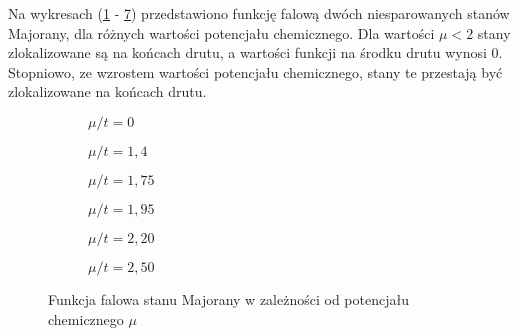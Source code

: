 \documentclass[a4paper, 12pt]{article}
\begin{document}
Na wykresach (\ref{fig:wave_1} - \ref{fig:wave_6}) przedstawiono funkcję falową dwóch niesparowanych stanów Majorany, dla różnych wartości potencjału chemicznego. Dla wartości $\mu < 2$ stany zlokalizowane są na końcach drutu, a wartości funkcji na środku drutu wynosi 0. Stopniowo, ze wzrostem wartości potencjału chemicznego, stany te przestają być zlokalizowane na końcach drutu.



\begin{figure}
\label{fig:kitaev_wave}
        \begin{subfigure}[b]{0.4\textwidth}
	            \fontsize{8}{10}\selectfont %
			    \resizebox{1.0\textwidth}{!}{}
                \caption{$\mu/t = 0$}
                \label{fig:wave_1}
        \end{subfigure}%
        \hspace{\fill}
        \begin{subfigure}[b]{0.4\textwidth}
                    \fontsize{8}{10}\selectfont %
			    \resizebox{1.0\textwidth}{!}{}
                \caption{$\mu/t = 1,4$}
                \label{fig:wave_2}
        \end{subfigure}%
        \hspace{\fill}
        \begin{subfigure}[b]{0.4\textwidth}
                    \fontsize{8}{10}\selectfont %
			    \resizebox{1.0\textwidth}{!}{}
                \caption{$\mu/t = 1,75$}
                \label{fig:wave_3}
        \end{subfigure}%
        \hspace{\fill}
        \begin{subfigure}[b]{0.4\textwidth}
                    \fontsize{8}{10}\selectfont %
			    \resizebox{1.0\textwidth}{!}{}
                \caption{$\mu/t = 1,95$}
                \label{fig:wave_4}
        \end{subfigure}
		\hspace{\fill}
        \begin{subfigure}[b]{0.4\textwidth}
	            \fontsize{8}{10}\selectfont %
			    \resizebox{1.0\textwidth}{!}{}
                \caption{$\mu/t = 2,20$}
                \label{fig:wave_5}
        \end{subfigure}
		\hspace{\fill}
        \begin{subfigure}[b]{0.4\textwidth}
	            \fontsize{8}{10}\selectfont %
			    \resizebox{1.0\textwidth}{!}{}
                \caption{$\mu/t = 2,50$}
                \label{fig:wave_6}
        \end{subfigure}

        \caption{Funkcja falowa stanu Majorany w zależności od potencjału chemicznego $\mu$}
\end{figure}
\end{document}
